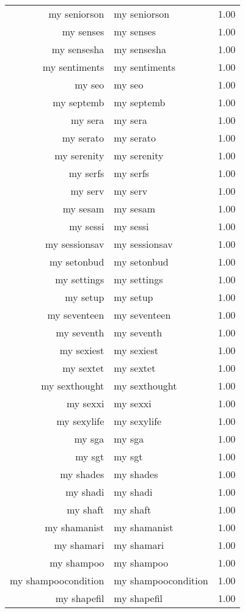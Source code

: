 \begin{table}[ht]
\begin{tabular}{rlr}
  my seniorson & my seniorson & 1.00 \\ 
  my senses & my senses & 1.00 \\ 
  my sensesha & my sensesha & 1.00 \\ 
  my sentiments & my sentiments & 1.00 \\ 
  my seo & my seo & 1.00 \\ 
  my septemb & my septemb & 1.00 \\ 
  my sera & my sera & 1.00 \\ 
  my serato & my serato & 1.00 \\ 
  my serenity & my serenity & 1.00 \\ 
  my serfs & my serfs & 1.00 \\ 
  my serv & my serv & 1.00 \\ 
  my sesam & my sesam & 1.00 \\ 
  my sessi & my sessi & 1.00 \\ 
  my sessionsav & my sessionsav & 1.00 \\ 
  my setonbud & my setonbud & 1.00 \\ 
  my settings & my settings & 1.00 \\ 
  my setup & my setup & 1.00 \\ 
  my seventeen & my seventeen & 1.00 \\ 
  my seventh & my seventh & 1.00 \\ 
  my sexiest & my sexiest & 1.00 \\ 
  my sextet & my sextet & 1.00 \\ 
  my sexthought & my sexthought & 1.00 \\ 
  my sexxi & my sexxi & 1.00 \\ 
  my sexylife & my sexylife & 1.00 \\ 
  my sga & my sga & 1.00 \\ 
  my sgt & my sgt & 1.00 \\ 
  my shades & my shades & 1.00 \\ 
  my shadi & my shadi & 1.00 \\ 
  my shaft & my shaft & 1.00 \\ 
  my shamanist & my shamanist & 1.00 \\ 
  my shamari & my shamari & 1.00 \\ 
  my shampoo & my shampoo & 1.00 \\ 
  my shampoocondition & my shampoocondition & 1.00 \\ 
  my shapefil & my shapefil & 1.00 \\ 

\end{tabular}
\end{table}
